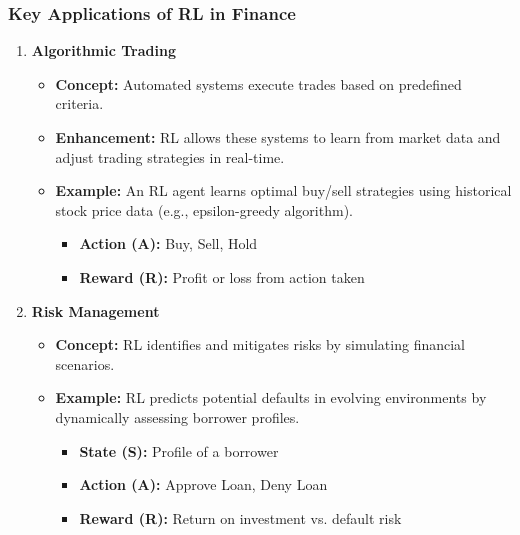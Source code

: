 \documentclass[aspectratio=169]{beamer}
\begin{document}
\begin{frame}[fragile]
    \frametitle{Key Applications of RL in Finance}
    \begin{enumerate}
        \item \textbf{Algorithmic Trading}
            \begin{itemize}
                \item \textbf{Concept:} Automated systems execute trades based on predefined criteria.
                \item \textbf{Enhancement:} RL allows these systems to learn from market data and adjust trading strategies in real-time.
                \item \textbf{Example:} An RL agent learns optimal buy/sell strategies using historical stock price data (e.g., epsilon-greedy algorithm).
                    \begin{itemize}
                        \item \textbf{Action (A):} Buy, Sell, Hold
                        \item \textbf{Reward (R):} Profit or loss from action taken
                    \end{itemize}
            \end{itemize}
        
        \item \textbf{Risk Management}
            \begin{itemize}
                \item \textbf{Concept:} RL identifies and mitigates risks by simulating financial scenarios.
                \item \textbf{Example:} RL predicts potential defaults in evolving environments by dynamically assessing borrower profiles.
                    \begin{itemize}
                        \item \textbf{State (S):} Profile of a borrower
                        \item \textbf{Action (A):} Approve Loan, Deny Loan
                        \item \textbf{Reward (R):} Return on investment vs. default risk
                    \end{itemize}
            \end{itemize}
    \end{enumerate}
\end{frame}
\end{document}
